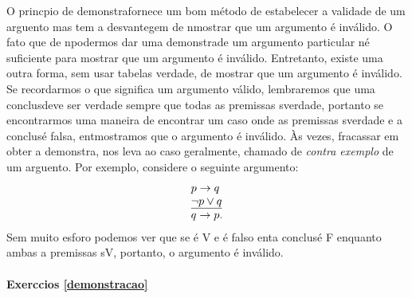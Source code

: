 O princ\ih pio de demonstra\cao fornece um bom m\'etodo de estabelecer a validade de um arguento mas tem a desvantegem de n\ao mostrar que um argumento \'e inv\'alido. O fato que de n\ao podermos dar uma demonstra\cao de um argumento particular n\ao \'e suficiente para mostrar que um argumento \'e inv\'alido. Entretanto, existe uma outra forma, sem usar tabelas verdade, de mostrar que um argumento \'e inv\'alido. Se recordarmos o que significa um argumento v\'alido, lembraremos que uma conclus\ao deve ser verdade sempre que todas as premissas s\ao verdade, portanto se encontrarmos uma maneira de encontrar um caso onde as premissas s\ao verdade e a conclus\ao \'e falsa, ent\ao mostramos que o argumento \'e inv\'alido. \`As vezes, fracassar em obter a demonstra\caoi, nos leva ao caso geralmente, chamado de \emph{contra exemplo} de um arguento. Por exemplo, considere o seguinte argumento:
\begin{eqnarray*}
\begin{tabular}{l}
$p\to q$ \\
$\underline{\nao p\ou q}$ \\
$q\to p$.
\end{tabular}
\end{eqnarray*}
Sem muito esfor\cc o podemos ver que se \qq \'e V e \pp \'e falso ent\ao a conclus\ao \'e F enquanto ambas a premissas s\ao V, portanto, o argumento \'e inv\'alido.

\paragraph{Exerc\ih cios \ref{demonstracao}}

